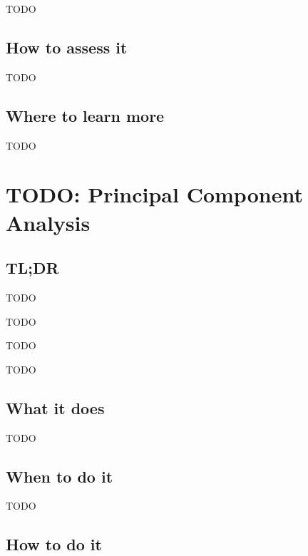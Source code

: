 \documentclass[
]{book}
\providecommand{\tightlist}{%
  \setlength{\itemsep}{0pt}\setlength{\parskip}{0pt}}
\begin{document}
TODO

\hypertarget{how-to-assess-it-19}{%
\section{How to assess it}\label{how-to-assess-it-19}}

TODO

\hypertarget{where-to-learn-more-19}{%
\section{Where to learn more}\label{where-to-learn-more-19}}

TODO

\hypertarget{principal-component-analysis}{%
\chapter{TODO: Principal Component Analysis}\label{principal-component-analysis}}

\hypertarget{tldr-20}{%
\section{TL;DR}\label{tldr-20}}

\begin{description}
\tightlist
\item[What it does]
TODO
\item[When to do it]
TODO
\item[How to do it]
TODO
\item[How to assess it]
TODO
\end{description}

\hypertarget{what-it-does-20}{%
\section{What it does}\label{what-it-does-20}}

TODO

\hypertarget{when-to-do-it-20}{%
\section{When to do it}\label{when-to-do-it-20}}

TODO

\hypertarget{how-to-do-it-20}{%
\section{How to do it}\label{how-to-do-it-20}}
\end{document}
